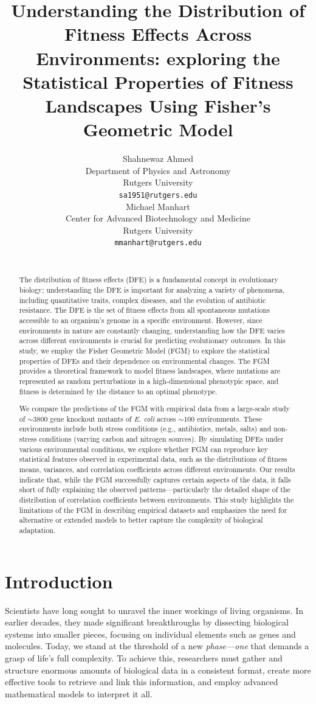 \documentclass[11pt]{article}
\title{ Understanding the Distribution of Fitness Effects Across Environments: exploring the Statistical Properties of Fitness Landscapes Using Fisher's Geometric Model}
\author{
 Shahnewaz Ahmed \\
  Department of Physics and Astronomy\\
Rutgers University\\
  \texttt{sa1951@rutgers.edu} \\
   \And
 Michael Manhart \\
  Center for Advanced Biotechnology and Medicine \\
  Rutgers University\\
  \texttt{mmanhart@rutgers.edu} \\
  \\
}
\begin{document}
\maketitle
\begin{abstract}
The distribution of fitness effects (DFE) is a fundamental concept in evolutionary biology; understanding the DFE is important for analyzing a variety of phenomena, including quantitative traits, complex diseases, and the evolution of antibiotic resistance. The DFE is the set of fitness effects from all spontaneous mutations accessible to an organism's genome in a specific environment. However, since environments in nature are constantly changing, understanding how the DFE varies across different environments is crucial for predicting evolutionary outcomes. In this study, we employ the Fisher Geometric Model (FGM) to explore the statistical properties of DFEs and their dependence on environmental changes. The FGM provides a theoretical framework to model fitness landscapes, where mutations are represented as random perturbations in a high-dimensional phenotypic space, and fitness is determined by the distance to an optimal phenotype.

We compare the predictions of the FGM with empirical data from a large-scale study of $\sim 3800$ gene knockout mutants of \textit{E. coli} across $\sim 100$ environments. These environments include both stress conditions (e.g., antibiotics, metals, salts) and non-stress conditions (varying carbon and nitrogen sources). By simulating DFEs under various environmental conditions, we explore whether FGM can reproduce key statistical features observed in experimental data, such as the distributions of fitness means, variances, and correlation coefficients across different environments. Our results indicate that, while the FGM successfully captures certain aspects of the data, it falls short of fully explaining the observed patterns—particularly the detailed shape of the distribution of correlation coefficients between environments. This study highlights the limitations of the FGM in describing empirical datasets and emphasizes the need for alternative or extended models to better capture the complexity of biological adaptation.
\end{abstract}




\section{Introduction}
Scientists have long sought to unravel the inner workings of living organisms. In earlier decades, they made significant breakthroughs by dissecting biological systems into smaller pieces, focusing on individual elements such as genes and molecules. Today, we stand at the threshold of a new \textit{phase—one} that demands a grasp of life's full complexity. To achieve this, researchers must gather and structure enormous amounts of biological data in a consistent format, create more effective tools to retrieve and link this information, and employ advanced mathematical models to interpret it all.
\end{document}
